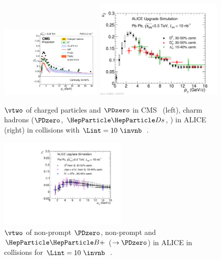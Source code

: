 \begin{figure}[ht]
  \begin{center}
    \includegraphics[width=0.43\textwidth]{hf/figures/cV2_lumiMB_0_wTheory_right.pdf}
   \includegraphics[width=0.54\textwidth]{hf/figures/ALICEUpgrade_charmv2.pdf}
    \caption{$\vtwo$ of charged particles and $\PDzero$ in CMS~\cite{CMS-PAS-FTR-17-002} (left), charm hadrons ($\PDzero$, $\PDs$, \PGLc) in ALICE (right) in \PbPb collisions with $\Lint=10~\invnb$~\cite{Abelev:1625842}.}
    \label{fig:RAAv2.v2charm}
  \end{center}
\end{figure}
\begin{figure}[ht]
  \begin{center}
    \includegraphics[width=0.54\textwidth]{hf/figures/ALICEUpgrade_beautyv2.pdf}
    \caption{$\vtwo$ of non-prompt $\PDzero$, non-prompt \PJGy and $\PBp$ ($\rightarrow \PDzero$) in ALICE in \PbPb collisions for $\Lint=10~\invnb$~\cite{Abelev:1625842}.}
    \label{fig:RAAv2.v2beauty}
  \end{center}
\end{figure}

